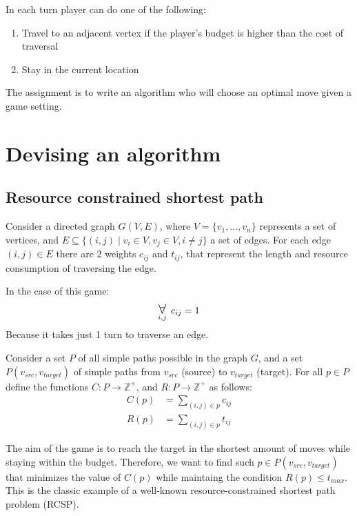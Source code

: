 \documentclass[12pt]{article}
\DeclareMathOperator*{\bigforall}{\mbox{\Large $\mathsurround0pt \forall$}}
\newcommand*{\source}{\ensuremath{v_{src}}}
\newcommand*{\target}{\ensuremath{v_{target}}}
\begin{document}
In each turn player can do one of the following:
\begin{enumerate}
    \item Travel to an adjacent vertex if the player's budget is higher than the cost of traversal
    \item Stay in the current location
\end{enumerate}

The assignment is to write an algorithm who will choose an optimal move given a game setting.

\section{Devising an algorithm}

\subsection{Resource constrained shortest path}

Consider a directed graph $G(V,E)$, where $V = \{v_1, \ldots , v_n\}$ represents a set of vertices,
and $E \subseteq \{ (i,j) \mid v_i \in V, v_j \in V, i \neq j \}$ a set of edges.
For each edge $(i,j) \in E$ there are 2 weights $c_{ij}$ and $t_{ij}$,
that represent the length and resource consumption of traversing the edge.

In the case of this game:
\begin{equation}
    \bigforall_{i,j} \; c_{ij} = 1
    \label{eq:all_cost_one}
\end{equation}
Because it takes just 1 turn to traverse an edge.

Consider a set $P$ of all simple paths possible in the graph $G$, and a set $P(\source,\target)$
of simple paths from $\source$ (source) to $\target$ (target).
For all $p \in P$ define the functions $C: P \to \mathbb{Z}^+$, and $R: P \to \mathbb{Z}^+$ as follows:
\begin{align}
    C(p) & = \sum\limits_{(i,j) \in p} c_{ij} \label{eq:len-func}  \\
    R(p) & = \sum\limits_{(i,j) \in p} t_{ij} \label{eq:cost-func}
\end{align}

The aim of the game is to reach the target in the shortest amount of moves while staying within the budget.
Therefore, we want to find such $p \in P(\source,\target)$ that minimizes the value of $C(p)$ while maintaing the condition $R(p) \leq t_{max}$.
This is the classic example of a well-known resource-constrained shortest path problem (RCSP).
\end{document}
